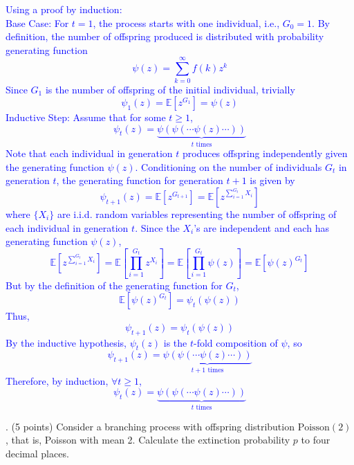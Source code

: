 \documentclass{article}
\begin{document}
\textcolor{blue}{
Using a proof by induction: \\ 
Base Case: For \( t = 1 \), the process starts with one individual, i.e., \( G_0 = 1 \). By definition, the number of offspring produced is distributed with probability generating function
\[
\psi(z) = \sum_{k=0}^{\infty} f(k)z^k
\]
Since \( G_1 \) is the number of offspring of the initial individual, trivially
\[
\psi_1(z) = \mathbb{E}[z^{G_1}] = \psi(z)
\]
Inductive Step: Assume that for some \( t \ge 1 \),
\[
\psi_t(z) = \underbrace{\psi(\psi(\cdots \psi(z) \cdots))}_{t \text{ times}}
\]
Note that each individual in generation \( t \) produces offspring independently given the generating function \( \psi(z) \). Conditioning on the number of individuals \( G_t \) in generation \( t \), the generating function for generation \( t+1 \) is given by
\[
\psi_{t+1}(z) = \mathbb{E}[z^{G_{t+1}}] = \mathbb{E}\left[z^{\sum_{i=1}^{G_t} X_i}\right]
\]
where \( \{X_i\} \) are i.i.d. random variables representing the number of offspring of each individual in generation \( t \). Since the \( X_i \)'s are independent and each has generating function \( \psi(z) \),
\[
\mathbb{E}\left[z^{\sum_{i=1}^{G_t} X_i}\right] = \mathbb{E}\left[\prod_{i=1}^{G_t} z^{X_i}\right] = \mathbb{E}\left[\prod_{i=1}^{G_t} \psi(z)\right] = \mathbb{E}\left[\psi(z)^{G_t}\right]
\]
But by the definition of the generating function for \( G_t \),
\[
\mathbb{E}\left[\psi(z)^{G_t}\right] = \psi_t(\psi(z))
\]
Thus,
\[
\psi_{t+1}(z) = \psi_t(\psi(z))
\]
By the inductive hypothesis, \( \psi_t(z) \) is the \( t \)-fold composition of \( \psi \), so
\[
\psi_{t+1}(z) = \underbrace{\psi(\psi(\cdots \psi(z) \cdots))}_{t+1 \text{ times}}
\]
Therefore, by induction, \(\forall t \geq 1 \),
\[
\psi_t(z) = \underbrace{\psi(\psi(\cdots \psi(z) \cdots))}_{t \text{ times}}
\]
}

. (5 points) Consider a branching process with offspring distribution $\text{Poisson}(2)$, that is, Poisson with mean 2. Calculate the extinction probability $p$ to four decimal places.
\end{document}
